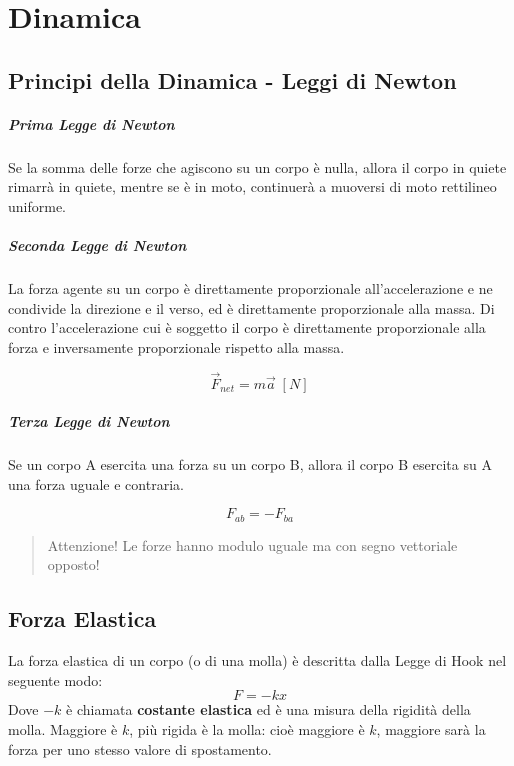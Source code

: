 \chapter{Dinamica}

    \section{Principi della Dinamica - Leggi di Newton}

        \paragraph{Prima Legge di Newton} Se la somma delle forze che agiscono 
        su un corpo è nulla, allora il corpo in quiete rimarrà in quiete, 
        mentre se è in moto, continuerà a muoversi di moto rettilineo uniforme.

        \paragraph{Seconda Legge di Newton} La forza agente su un corpo è 
        direttamente proporzionale all'accelerazione e ne condivide la 
        direzione e il verso, ed è direttamente proporzionale alla massa. Di 
        contro l'accelerazione cui è soggetto il corpo è direttamente 
        proporzionale alla forza e inversamente proporzionale rispetto alla 
        massa.

        \begin{equation}
            \vec{F}_{net} = m \vec{a} \; [N]
        \end{equation}

        \paragraph{Terza Legge di Newton} Se un corpo A esercita una forza su 
        un corpo B, allora il corpo B esercita su A una forza uguale e 
        contraria.

        \begin{equation}
            F_{ab} = - F_{ba}
        \end{equation}

        \begin{quote}
            Attenzione! Le forze hanno modulo uguale ma con segno vettoriale 
            opposto!
        \end{quote}

    \section{Forza Elastica} La forza elastica di un corpo (o di una molla) è 
    descritta dalla Legge di Hook nel seguente modo:
        \begin{equation}
            F = -kx
        \end{equation}
    Dove $-k$ è chiamata \textbf{costante elastica} ed è una misura della 
    rigidità della molla. Maggiore è $k$, più rigida è la molla: cioè maggiore 
    è $k$, maggiore sarà la forza per uno stesso valore di spostamento.

